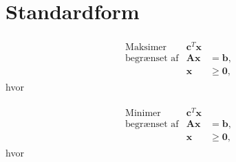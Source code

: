 \section{Standardform}
% 

\begin{align*}
\begin{array}{lrl}
\text{Maksimer}		&\textbf{c}^T\textbf{x}	&				\\
\text{begrænset af}	&\textbf{A}\textbf{x}	&=\mathbf{b},	\\
					&\mathbf{x}				&\geq \mathbf{0},		
\end{array}
\end{align*}
hvor 

\begin{align*}
\begin{array}{lrl}
\text{Minimer}		&\textbf{c}^T\textbf{x}	&				\\
\text{begrænset af}	&\textbf{A}\textbf{x}	&=\mathbf{b},	\\
					&\mathbf{x}				&\geq \mathbf{0},		
\end{array}
\end{align*}
hvor 

\begin{align*}

\end{align*}
